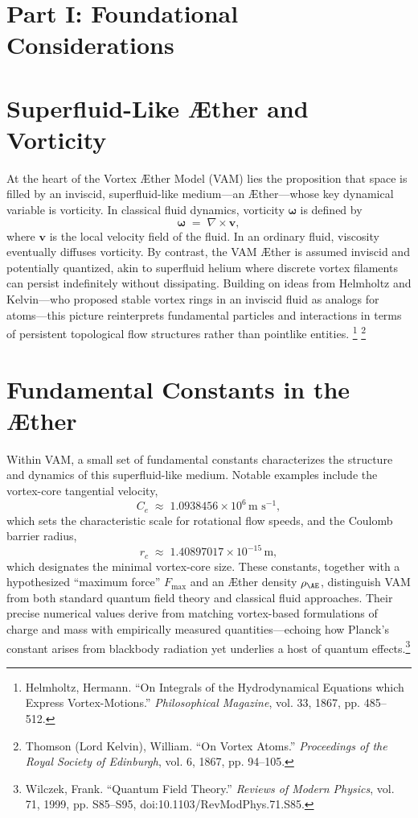 \documentclass[aps,preprint,superscriptaddress]{revtex4-2}
\begin{document}
    \section*{Part I: Foundational Considerations}\label{sec:part-1}
    \section{Superfluid-Like Æther and Vorticity}

    At the heart of the Vortex Æther Model (VAM) lies the proposition that space is filled by an inviscid, superfluid-like medium—an Æther—whose key dynamical variable is vorticity. In classical fluid dynamics, vorticity \(\boldsymbol{\omega}\) is defined by
    \[
        \boldsymbol{\omega} \;=\; \nabla \times \mathbf{v},
    \]
    where \(\mathbf{v}\) is the local velocity field of the fluid. In an ordinary fluid, viscosity eventually diffuses vorticity. By contrast, the VAM Æther is assumed inviscid and potentially quantized, akin to superfluid helium where discrete vortex filaments can persist indefinitely without dissipating. Building on ideas from Helmholtz and Kelvin—who proposed stable vortex rings in an inviscid fluid as analogs for atoms—this picture reinterprets fundamental particles and interactions in terms of persistent topological flow structures rather than pointlike entities.
    \footnote{Helmholtz, Hermann. “On Integrals of the Hydrodynamical Equations which Express Vortex-Motions.” \textit{Philosophical Magazine}, vol. 33, 1867, pp. 485–512.}
    \footnote{Thomson (Lord Kelvin), William. “On Vortex Atoms.” \textit{Proceedings of the Royal Society of Edinburgh}, vol. 6, 1867, pp. 94–105.}

    \section{Fundamental Constants in the Æther}

    Within VAM, a small set of fundamental constants characterizes the structure and dynamics of this superfluid-like medium. Notable examples include the vortex-core tangential velocity,
    \[
        C_{e} \;\approx\; 1.0938456 \times 10^{6} \, \text{m s}^{-1},
    \]
    which sets the characteristic scale for rotational flow speeds, and the Coulomb barrier radius,
    \[
        r_{c} \;\approx\; 1.40897017 \times 10^{-15} \, \text{m},
    \]
    which designates the minimal vortex-core size. These constants, together with a hypothesized “maximum force” \(F_{\text{max}}\) and an Æther density \(\rho_{\mathrm{\AE}}\), distinguish VAM from both standard quantum field theory and classical fluid approaches. Their precise numerical values derive from matching vortex-based formulations of charge and mass with empirically measured quantities—echoing how Planck’s constant arises from blackbody radiation yet underlies a host of quantum effects.\footnote{Wilczek, Frank. “Quantum Field Theory.” \textit{Reviews of Modern Physics}, vol. 71, 1999, pp. S85–S95, doi:10.1103/RevModPhys.71.S85.}
\end{document}

